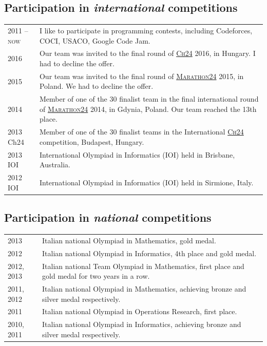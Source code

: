 \documentclass[10PT,letter]{article}
\newcommand{\subsectionstyle}[1]{\normalfont\selectfont\textcolor{titlecol}{\sffamily #1}}
\begin{document}
        \subsection*{\subsectionstyle{Participation in \emph{international} competitions}}
            \begin{tabular}{p{1in}p{5.55in}}
                \textsc{2011 -- now} &  I like to participate in programming contests, including Codeforces, COCI, USACO, Google Code Jam.\\[.5mm]
                \textsc{2016} &  Our team was invited to the final round of \href{http://ch24.org/}{\textsc{Ch24}} 2016, in Hungary. I had to decline the offer.\\[.5mm]
                \textsc{2015} &  Our team was invited to the final round of \href{http://marathon24.com/}{\textsc{Marathon24}} 2015, in Poland. We had to decline the offer.\\[.5mm]
                \textsc{2014} &  Member of one of the 30 finalist team in the final international round of \href{http://marathon24.com/}{\textsc{Marathon24}} 2014, in Gdynia, Poland. Our team reached the 13th place.\\[.5mm]
                \textsc{2013} Ch24 &  Member of one of the 30 finalist teams in the {International \href{http://ch24.org/static/archive2013/}{\textsc{Ch24}} competition}, {Budapest, Hungary}.\\[.5mm]
                \textsc{2013} IOI &  {International Olympiad in Informatics} (IOI) held in {Brisbane, Australia}.\\[.5mm]
                \textsc{2012} IOI &  {International Olympiad in Informatics} (IOI) held in {Sirmione, Italy}.
            \end{tabular}

        \vspace{3pt}
        \subsection*{\subsectionstyle{Participation in \emph{national} competitions}}
            \begin{tabular}{p{1in}p{5.55in}}
                \textsc{2013} & Italian national Olympiad in Mathematics, gold medal.\\[.5mm]
                \textsc{2012} & Italian national Olympiad in Informatics, 4th place and gold medal.\\[.5mm]
                \textsc{2012, 2013} & Italian national Team Olympiad in Mathematics, first place and gold medal for two years in a row.\\[.5mm]
                \textsc{2011, 2012} &  Italian national Olympiad in Mathematics, achieving bronze and silver medal respectively.\\[.5mm]
                \textsc{2011} & Italian national Olympiad in Operations Research, first place.\\[.5mm]
                \textsc{2010, 2011} & Italian national Olympiad in Informatics, achieving bronze and silver medal respectively.
            \end{tabular}
    \vspace{3pt}
    
\end{document}
